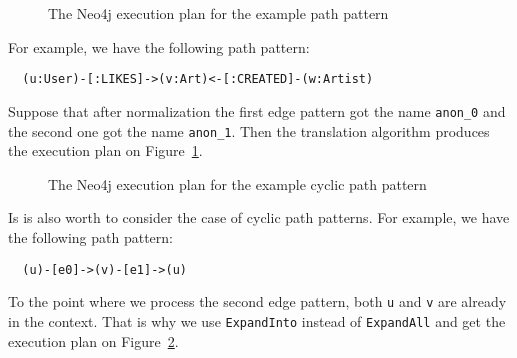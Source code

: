 \documentclass[14pt]{constructor-thesis}
\theoremstyle{definition}
\begin{document}
\begin{figure}
  
  \caption{The Neo4j execution plan for the example path pattern}
  \label{fig:neo4j-execution-plan}
\end{figure}

For example, we have the following path pattern:
\begin{verbatim}
  (u:User)-[:LIKES]->(v:Art)<-[:CREATED]-(w:Artist)
\end{verbatim}
Suppose that after normalization the first edge pattern got the name \texttt{anon\_0} and the second one got the name \texttt{anon\_1}. Then the translation algorithm produces the execution plan on Figure~\ref{fig:neo4j-execution-plan}.

\begin{figure}
  
  \caption{The Neo4j execution plan for the example cyclic path pattern}
  \label{fig:neo4j-execution-plan-cyclic}
\end{figure}

Is is also worth to consider the case of cyclic path patterns. For example, we have the following path pattern:
\begin{verbatim}
  (u)-[e0]->(v)-[e1]->(u)
\end{verbatim}
To the point where we process the second edge pattern, both \texttt{u} and \texttt{v} are already in the context. That is why we use \texttt{ExpandInto} instead of \texttt{ExpandAll} and get the execution plan on Figure~\ref{fig:neo4j-execution-plan-cyclic}.
\end{document}
